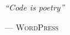 \begin{flushright}
	\normalsize
	\textit{``Code is poetry''}\medskip

	\scriptsize --- \textsc{WordPress}
\end{flushright}
